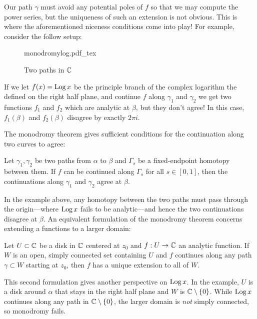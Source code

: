 Our path \(\gamma\) must avoid any potential poles of \(f\) so that we may
compute the power series, but the uniqueness of such an extension is not
obvious. This is where the aforementioned niceness conditions come into play!
For example, consider the follow setup:

\begin{figure}[h!]
\centering
  \def\svgwidth{0.52\columnwidth}
  {monodromylog.pdf_tex}
\caption{Two paths in \(\mathbb{C} \)}
\label{fig:monolog}
\end{figure}

\begin{example}%
\label{ex:logmono}
If we let \(f(x)=\operatorname{Log} x\) be the principle branch of the complex logarithm the
defined on the right half plane, and continue \(f\) along \(\gamma_1\) and
\(\gamma_2\) we get two functions \(f_1\) and \(f_2\) which are analytic at
\(\beta\), but they don't agree! In this case, \(f_1(\beta)\) and \(f_2(\beta)\)
disagree by exactly \(2\pi i\).
\end{example}

The monodromy theorem gives sufficient conditions for the continuation along
two curves to agree:

\begin{theorem}[Monodromy I]%
\label{thm:mon1}
  Let \(\gamma_1, \gamma_2\) be two paths from \(\alpha\) to \(\beta\) and
  \(\Gamma_s\) be a fixed-endpoint homotopy between them. If \(f\) can be
  continued along \(\Gamma_s\) for all \(s \in [0,1]\), then the continuations
  along \(\gamma_1\) and \(\gamma_2\) agree at \(\beta\).
\end{theorem}

In the example above, any homotopy between the two paths must pass through the
origin---where \(\operatorname{Log} x\) fails to be analytic---and hence the two continuations
disagree at \(\beta\).
An equivalent formulation of the monodromy theorem concerns extending a
functions to a larger domain:

\begin{theorem}[Monodromy II]%
\label{thm:mon2}
  Let \(U \subset \mathbb{C} \) be a disk in \(\mathbb{C} \) centered at \(z_0\) and
  \(f: U \to \mathbb{C} \) an analytic function. If \(W\) is
  an open, simply connected set containing \(U\) and \(f\) continues along any
  path \(\gamma \subset W\) starting at \(z_0\), then \(f\) has a unique
  extension to all of \(W\).
\end{theorem}

This second formulation gives another perspective on \(\operatorname{Log} x\). In the example,
\(U\) is a disk around \(\alpha\) that stays in the right half plane and \(W\)
is \(\mathbb{C} \setminus \{0\} \). While \(\operatorname{Log} x\) continues along any path in
\(\mathbb{C}  \setminus \{0\} \), the larger domain is \emph{not} simply connected, so
monodromy fails.

